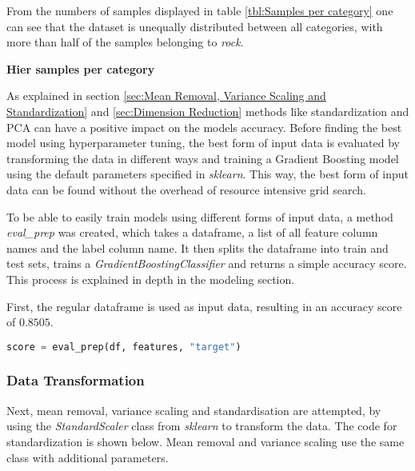 \label{tbl:Category to Target Integer mapping}


From the numbers of samples displayed in table \ref{tbl:Samples per category} one can see that the dataset is 
unequally distributed between all categories, with more than half of the samples belonging to \emph{rock}.

\textbf{Hier samples per category}

As explained in section \ref{sec:Mean Removal, Variance Scaling and Standardization} and \ref{sec:Dimension Reduction}
methods like standardization and \ac{PCA} can have a positive impact on the models accuracy.
Before finding the best model using hyperparameter tuning, the best form of input data is evaluated by transforming
the data in different ways and training a Gradient Boosting model using the default parameters specified in \emph{sklearn}.
This way, the best form of input data can be found without the overhead of resource intensive grid search.

To be able to easily train models using different forms of input data, a method \emph{eval\_prep} was created,
which takes a dataframe, a list of all feature column names and the label column name. It then splits the dataframe
into train and test sets, trains a \emph{GradientBoostingClassifier} and returns a simple accuracy score.
This process is explained in depth in the modeling section.

First, the regular dataframe is used as input data, resulting in an accuracy score of $0.8505$.

\begin{lstlisting}[language=Python]
    score = eval_prep(df, features, "target")
\end{lstlisting}

\subsubsection{Data Transformation}

Next, mean removal, variance scaling and standardisation are attempted, by using the \emph{StandardScaler}
class from \emph{sklearn} to transform the data. The code for standardization is shown below.
Mean removal and variance scaling use the same class with additional parameters.

